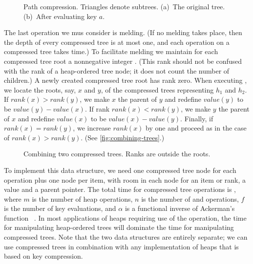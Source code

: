 \begin{figure}
	\caption{Path compression. Triangles denote subtrees. (a)~The original tree.
	(b)~After evaluating key \(a\).}
    \label{fig:path-compression}
\end{figure}

The last operation we mus consider is melding. (If no melding takes place, then the
depth of every compressed tree is at most one, and each operation on a compressed
tree takes  time.) To facilitate melding we maintain for each compressed tree
root a nonnegative integer . (This rank should not be confused with the
rank of a heap-ordered tree node; it does not count the number of children.) A newly
created compressed tree root has rank zero. When executing ,
we locate the roots, say, \(x\) and \(y\), of the compressed trees representing
\(h_1\) and \(h_2\). If \(rank(x) > rank(y)\), we make \(x\) the parent of \(y\) and
redefine \(value(y)\) to be \(value(y) - value(x)\). If rank \(rank(x) < rank(y)\),
we make \(y\) the parent of \(x\) and redefine \(value(x)\) to be \(value(x)
- value(y)\). Finally, if \(rank(x) = rank(y)\), we increase \(rank(x)\) by one and
proceed as in the case of \(rank(x) > rank(y)\). (See \autoref{fig:combining-trees}.)

\begin{figure}
	\caption{Combining two compressed trees. Ranks are outside the roots.}
    \label{fig:combining-trees}
\end{figure}

To implement this data structure, we need one compressed tree node for each
 operation plus one node per item, with room in each node for an item
or rank, a value and a parent pointer. The total time for compressed tree operations
is , where \(m\) is the number of heap operations, \(n\)
is the number of  and  operations, \(f\) is the number of
key evaluations, and \(\alpha\) is a functional inverse of Ackerman's function~%
\cite{Tarjan1979b,TarjanVanLeeuwen1984}. In most applications of heaps requiring use
of the  operation, the time for manipulating heap-ordered trees
will dominate the time for manipulating compressed trees. Note that the two data
structures are entirely separate; we can use compressed trees in combination with any
implementation of heaps that is based on key compression.

